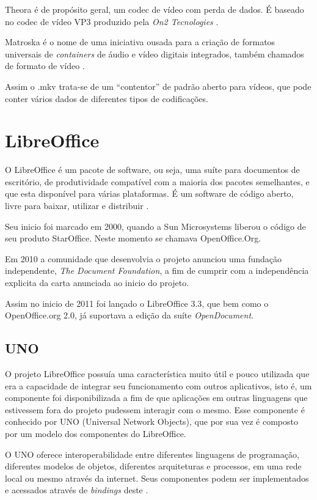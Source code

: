 Theora é de propósito geral, um codec de vídeo com perda de dados. É baseado no codec de vídeo VP3 produzido pela \textit{On2 Tecnologies} \cite{XIPH-THEORA}.

Matroska é o nome de uma iniciativa ousada para a criação de formatos universais de \textit{containers} de áudio e vídeo digitais integrados, também chamados de formato de vídeo \cite{WIKIPEDIA-MATROSKA}.

Assim o .mkv trata-se de um ``contentor'' de padrão aberto para vídeos, que pode conter vários dados de diferentes tipos de codificações.

\section{LibreOffice}

O LibreOffice é um pacote de software, ou seja, uma suíte para documentos de escritório, de produtividade compatível com a maioria dos pacotes semelhantes, e que esta disponível para várias plataformas. É um software de código aberto, livre para baixar, utilizar e distribuir \cite{LibreOffice}.

Seu inicio foi marcado em 2000, quando a Sun Microsystems liberou o código de seu produto StarOffice. Neste momento se chamava OpenOffice.Org. 

Em 2010 a comunidade que desenvolvia o projeto anunciou uma fundação independente, \textit{The Document Foundation}, a fim de cumprir com a independência explicita da carta anunciada ao inicio do projeto.

Assim no inicio de 2011 foi lançado o LibreOffice 3.3, que bem como o OpenOffice.org 2.0, já suportava a edição da suíte \textit{OpenDocument}.


\subsection{UNO}
\label{uno}

O projeto LibreOffice possuía uma característica muito útil e pouco utilizada que era a capacidade de integrar seu funcionamento com outros aplicativos, isto é, um componente foi disponibilizada a fim de que aplicações em outras linguagens que estivessem fora do projeto pudessem interagir com o mesmo. Esse componente é conhecido por UNO (Universal Network Objects), que por sua vez é composto por um modelo dos componentes do LibreOffice.

O UNO oferece interoperabilidade entre diferentes linguagens de programação, diferentes modelos de objetos, diferentes arquiteturas e processos, em uma rede local ou mesmo através da internet. Seus componentes podem ser implementados e acessados através de \textit{bindings} deste \cite{MINETTO-PYUNO}.


